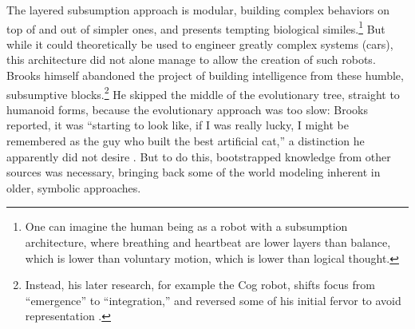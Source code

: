 



The layered subsumption approach is modular, building complex
behaviors on top of and out of simpler ones, and presents tempting
biological similes.\footnote{One can imagine the human being as a
robot with a subsumption 
architecture, where breathing and heartbeat are lower layers than balance,
which is lower than voluntary motion, which is lower than logical
thought.} But while it could theoretically be used to engineer greatly
complex systems (cars), this architecture did not alone manage to allow the
creation of such robots.
Brooks himself abandoned the project of building intelligence from
these humble, subsumptive blocks.\footnote{Instead, his later research, for example
the Cog robot, shifts focus from ``emergence'' to ``integration,'' and
reversed some of his initial fervor to avoid representation \cite[p.
  258]{ekbia}.} He skipped the middle of the evolutionary tree, straight
to humanoid forms, because the evolutionary approach was too slow: 
Brooks reported, it was ``starting to look like, if I was really
lucky, I might be remembered as the guy who built the best artificial
cat,'' a distinction he apparently did not desire \cite[p.
  65]{brooksflesh}. But to do this, bootstrapped knowledge from other sources was
necessary, bringing back some of the world modeling inherent in older,
symbolic approaches. 

